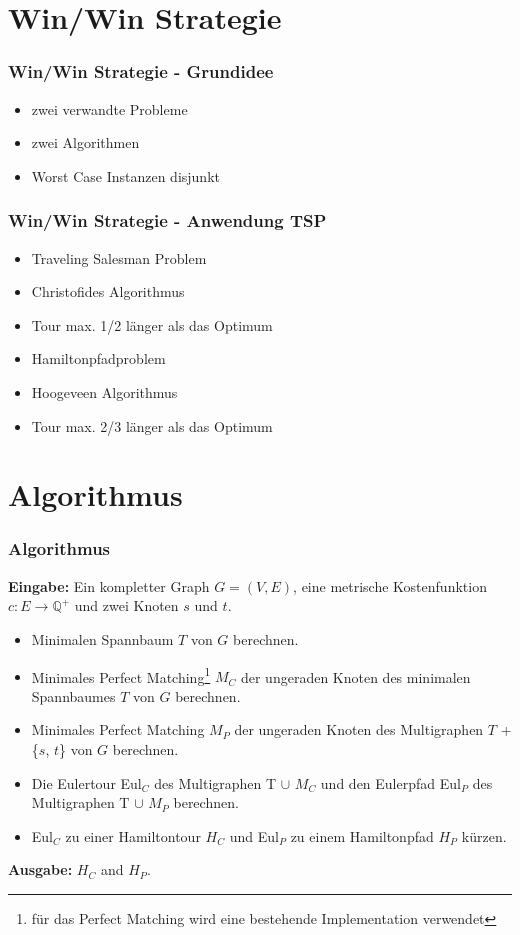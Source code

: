 \documentclass[12pt]{beamer}
\begin{document}
    \section{Win/Win Strategie}
    \begin{frame}
        \frametitle{Win/Win Strategie - Grundidee}
	    \begin{itemize}
                \item zwei verwandte Probleme
                \item zwei Algorithmen
                \item Worst Case Instanzen disjunkt
            \end{itemize}
    \end{frame}
    \begin{frame}
        \frametitle{Win/Win Strategie - Anwendung TSP}
	    \begin{itemize}
                \item Traveling Salesman Problem
                \item Christofides Algorithmus
                \item Tour max. 1/2 länger als das Optimum
                    \medskip
                \item Hamiltonpfadproblem
                \item Hoogeveen Algorithmus 
                \item Tour max. 2/3 länger als das Optimum
            \end{itemize}
    \end{frame}
    \section{Algorithmus}
    \begin{frame}
    \frametitle{Algorithmus}
        \begin{scriptsize}
        \textbf{Eingabe:} Ein kompletter Graph $G = (V,E)$, eine metrische Kostenfunktion $c: E \rightarrow \mathbb{Q}^+$ und zwei Knoten $s$ und $t$.

        \begin{itemize}
            \item[1.] Minimalen Spannbaum $T$ von $G$ berechnen.
            \item[2.] Minimales Perfect Matching\footnote{für das Perfect Matching wird eine bestehende Implementation verwendet} $M_C$ der ungeraden Knoten des minimalen Spannbaumes $T$ von $G$ berechnen.
            \item[3.] Minimales Perfect Matching $M_P$ der ungeraden Knoten des Multigraphen $T$ + \{$s$, $t$\} von $G$ berechnen.
            \item[4.] Die Eulertour Eul$_C$ des Multigraphen T $\cup$ $M_C$ und den Eulerpfad Eul$_P$ des Multigraphen T $\cup$ $M_P$ berechnen.
            \item[6.] Eul$_C$ zu einer Hamiltontour $H_C$ und Eul$_P$ zu einem Hamiltonpfad $H_P$ kürzen.
        \end{itemize}
        \textbf{Ausgabe:} $H_C$ and $H_P$.
        \end{scriptsize}
    \end{frame}
\end{document}
